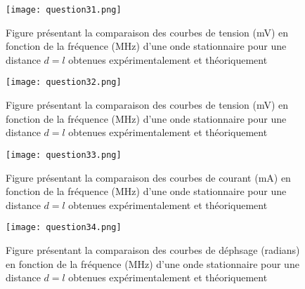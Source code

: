  \begin{figure}[H]
\centering
\texttt{[image: question31.png]}
\caption{Figure présentant la comparaison des courbes de tension (mV) en fonction de la fréquence (MHz) d'une onde stationnaire pour une distance $d = l$ obtenues expérimentalement et théoriquement}
\label{fig:1}
\end{figure}
\begin{figure}[H]
\centering
\texttt{[image: question32.png]}
\caption{Figure présentant la comparaison des courbes de tension (mV) en fonction de la fréquence (MHz) d'une onde stationnaire pour une distance $d = l$ obtenues expérimentalement et théoriquement}
\label{fig:2}
\end{figure}
\begin{figure}[htbp]
\centering
\texttt{[image: question33.png]}
\caption{Figure présentant la comparaison des courbes de courant (mA) en fonction de la fréquence (MHz) d'une onde stationnaire pour une distance $d = l$ obtenues expérimentalement et théoriquement}
\label{fig:3}
\end{figure}
 \begin{figure}[H]
\centering
\texttt{[image: question34.png]}
\caption{Figure présentant la comparaison des courbes de déphsage (radians) en fonction de la fréquence (MHz) d'une onde stationnaire pour une distance $d = l$ obtenues expérimentalement et théoriquement}
\label{fig:4}
\end{figure}
  
